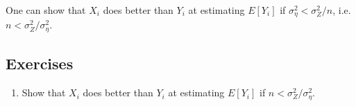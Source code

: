 \documentclass{article}
\begin{document}
      One can show that $X_i$ does better than $Y_i$ at estimating $E[Y_i]$ if $\sigma^2_\eta < \sigma^2_Z / n$, i.e. $n < \sigma^2_Z / \sigma^2_\eta$.

    \subsection{Exercises}
    
    \begin{enumerate}
      \item Show that $X_i$ does better than $Y_i$ at estimating $E[Y_i]$ if $n < \sigma^2_Z / \sigma^2_\eta$.
    \end{enumerate}
\end{document}
